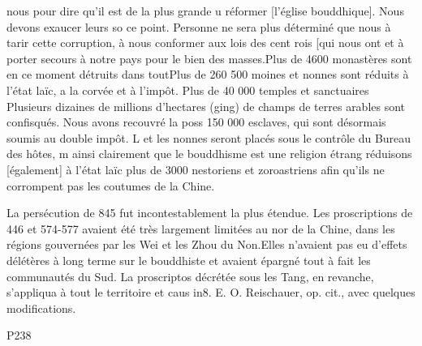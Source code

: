 nous pour dire qu'il est de la plus grande u réformer [l'église bouddhique]. Nous devons exaucer leurs so ce point. Personne ne sera plus déterminé que nous à tarir cette corruption, à nous conformer aux lois des cent rois [qui nous ont et à porter secours à notre pays pour le bien des masses.Plus de 4600 monastères sont en ce moment détruits dans toutPlus de 260 500 moines et nonnes sont réduits à l'état laïc, a la corvée et à l'impôt. Plus de 40 000 temples et sanctuaires Plusieurs dizaines de millions d'hectares (ging) de champs de terres arables sont confisqués. Nous avons recouvré la poss 150 000 esclaves, qui sont désormais soumis au double impôt. L et les nonnes seront placés sous le contrôle du Bureau des hôtes, m ainsi clairement que le bouddhisme est une religion étrang réduisons [également] à l'état laïc plus de 3000 nestoriens et zoroastriens afin qu'ils ne corrompent pas les coutumes de la Chine.

La persécution de 845 fut incontestablement la plus étendue. Les proscriptions de 446 et 574-577 avaient été très largement limitées au nor de la Chine, dans les régions gouvernées par les Wei et les Zhou du Non.Elles n'avaient pas eu d'effets délétères à long terme sur le bouddhiste et avaient épargné tout à fait les communautés du Sud. La proscriptos décrétée sous les Tang, en revanche, s'appliqua à tout le territoire et caus in8. E. O. Reischauer, op. cit., avec quelques modifications.

P238

